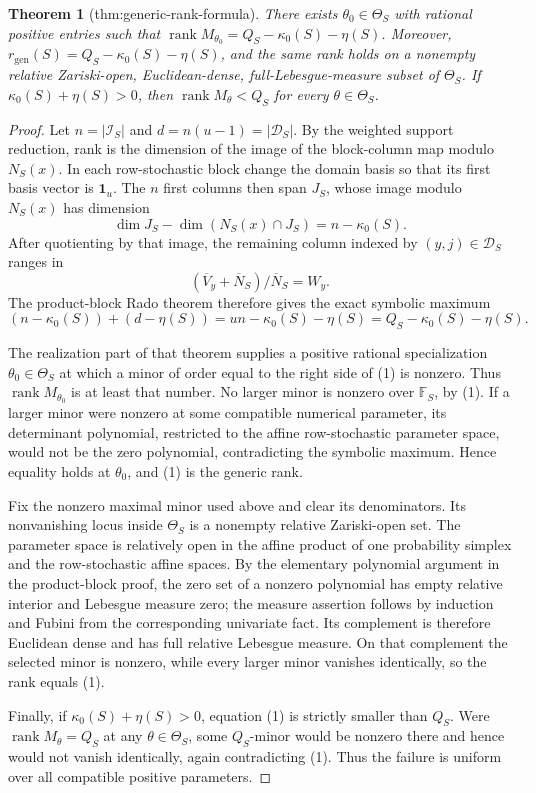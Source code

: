\documentclass{article}
\newtheorem{theorem}{Theorem}
\begin{document}
\begin{theorem}[thm:generic-rank-formula]\label{thm:generic-rank-formula}
There exists \(\theta_0\in\Theta_S\) with rational positive entries such that \(\operatorname{rank}M_{\theta_0}=Q_S-\kappa_0(S)-\eta(S)\). Moreover, \(r_{\mathrm{gen}}(S)=Q_S-\kappa_0(S)-\eta(S)\), and the same rank holds on a nonempty relative Zariski-open, Euclidean-dense, full-Lebesgue-measure subset of \(\Theta_S\). If \(\kappa_0(S)+\eta(S)>0\), then \(\operatorname{rank}M_\theta<Q_S\) for every \(\theta\in\Theta_S\).
\end{theorem}
\begin{proof}
Let \(n=|\mathcal I_S|\) and \(d=n(u-1)=|\mathcal D_S|\).  By the weighted support reduction, rank is the dimension of the image of the block-column map modulo \(N_S(x)\).  In each row-stochastic block change the domain basis so that its first basis vector is \(\mathbf 1_u\).  The \(n\) first columns then span \(J_S\), whose image modulo \(N_S(x)\) has dimension
\[
\dim J_S-\dim(N_S(x)\cap J_S)=n-\kappa_0(S).
\]
After quotienting by that image, the remaining column indexed by \((y,j)\in\mathcal D_S\) ranges in
\[
(\overline V_y+\overline N_S)/\overline N_S=W_y.
\]
The product-block Rado theorem therefore gives the exact symbolic maximum
\[
(n-\kappa_0(S))+(d-\eta(S))
=un-\kappa_0(S)-\eta(S)
=Q_S-\kappa_0(S)-\eta(S). \tag{1}
\]

The realization part of that theorem supplies a positive rational specialization \(\theta_0\in\Theta_S\) at which a minor of order equal to the right side of (1) is nonzero.  Thus \(\operatorname{rank}M_{\theta_0}\) is at least that number.  No larger minor is nonzero over \(\mathbb F_S\), by (1).  If a larger minor were nonzero at some compatible numerical parameter, its determinant polynomial, restricted to the affine row-stochastic parameter space, would not be the zero polynomial, contradicting the symbolic maximum.  Hence equality holds at \(\theta_0\), and (1) is the generic rank.

Fix the nonzero maximal minor used above and clear its denominators.  Its nonvanishing locus inside \(\Theta_S\) is a nonempty relative Zariski-open set.  The parameter space is relatively open in the affine product of one probability simplex and the row-stochastic affine spaces.  By the elementary polynomial argument in the product-block proof, the zero set of a nonzero polynomial has empty relative interior and Lebesgue measure zero; the measure assertion follows by induction and Fubini from the corresponding univariate fact.  Its complement is therefore Euclidean dense and has full relative Lebesgue measure.  On that complement the selected minor is nonzero, while every larger minor vanishes identically, so the rank equals (1).

Finally, if \(\kappa_0(S)+\eta(S)>0\), equation (1) is strictly smaller than \(Q_S\).  Were \(\operatorname{rank}M_\theta=Q_S\) at any \(\theta\in\Theta_S\), some \(Q_S\)-minor would be nonzero there and hence would not vanish identically, again contradicting (1).  Thus the failure is uniform over all compatible positive parameters.
\end{proof}
\end{document}
